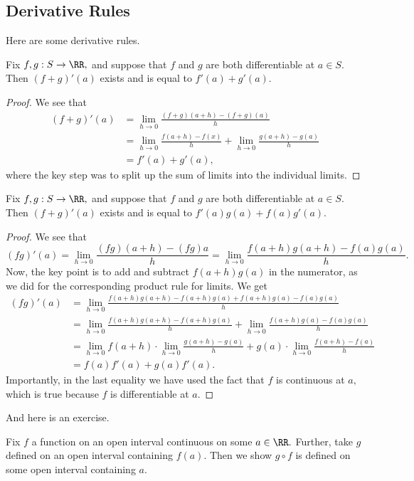 \subsection{Derivative Rules}
Here are some derivative rules.
\begin{proposition}
	Fix $f,g:S\to\RR,$ and suppose that $f$ and $g$ are both differentiable at $a\in S.$ Then $(f+g)'(a)$ exists and is equal to $f'(a)+g'(a).$
\end{proposition}
\begin{proof}
	We see that
	\begin{align*}
		(f+g)'(a) &= \lim_{h\to0}\frac{(f+g)(a+h)-(f+g)(a)}h \\
		&= \lim_{h\to0}\frac{f(a+h)-f(x)}h+\lim_{h\to0}\frac{g(a+h)-g(a)}h \\
		&= f'(a)+g'(a),
	\end{align*}
	where the key step was to split up the sum of limits into the individual limits.
\end{proof}
\begin{proposition}
	Fix $f,g:S\to\RR,$ and suppose that $f$ and $g$ are both differentiable at $a\in S.$ Then $(f+g)'(a)$ exists and is equal to $f'(a)g(a)+f(a)g'(a).$
\end{proposition}
\begin{proof}
	We see that
	\[(fg)'(a)=\lim_{h\to0}\frac{(fg)(a+h)-(fg)a}h=\lim_{h\to0}\frac{f(a+h)g(a+h)-f(a)g(a)}h.\]
	Now, the key point is to add and subtract $f(a+h)g(a)$ in the numerator, as we did for the corresponding product rule for limits. We get
	\begin{align*}
		(fg)'(a) &= \lim_{h\to0}\frac{f(a+h)g(a+h)-f(a+h)g(a)+f(a+h)g(a)-f(a)g(a)}h \\
		&= \lim_{h\to0}\frac{f(a+h)g(a+h)-f(a+h)g(a)}h+\lim_{h\to0}\frac{f(a+h)g(a)-f(a)g(a)}h \\
		&= \lim_{h\to0}f(a+h)\cdot\lim_{h\to0}\frac{g(a+h)-g(a)}h+g(a)\cdot\lim_{h\to0}\frac{f(a+h)-f(a)}h \\
		&= f(a)f'(a)+g(a)f'(a).
	\end{align*}
	Importantly, in the last equality we have used the fact that $f$ is continuous at $a,$ which is true because $f$ is differentiable at $a.$
\end{proof}
And here is an exercise.
\begin{exe}
	Fix $f$ a function on an open interval continuous on some $a\in\RR.$ Further, take $g$ defined on an open interval containing $f(a).$ Then we show $g\circ f$ is defined on some open interval containing $a.$
\end{exe}
